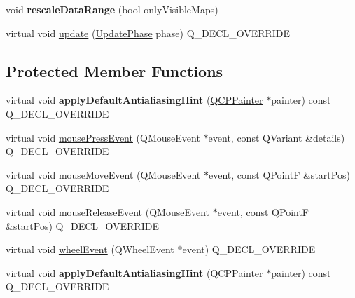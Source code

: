 \begin{DoxyCompactItemize}
\item 
void {\bfseries rescale\+Data\+Range} (bool only\+Visible\+Maps)\hypertarget{class_q_c_p_color_scale_a425983db4478543924ddbd04ea20a356}{}\label{class_q_c_p_color_scale_a425983db4478543924ddbd04ea20a356}

\item 
virtual void \hyperlink{class_q_c_p_color_scale_a5bbae1d186440907cc95b1afdcfd0290}{update} (\hyperlink{class_q_c_p_layout_element_a0d83360e05735735aaf6d7983c56374d}{Update\+Phase} phase) Q\+\_\+\+D\+E\+C\+L\+\_\+\+O\+V\+E\+R\+R\+I\+DE
\end{DoxyCompactItemize}
\subsection*{Protected Member Functions}
\begin{DoxyCompactItemize}
\item 
virtual void {\bfseries apply\+Default\+Antialiasing\+Hint} (\hyperlink{class_q_c_p_painter}{Q\+C\+P\+Painter} $\ast$painter) const Q\+\_\+\+D\+E\+C\+L\+\_\+\+O\+V\+E\+R\+R\+I\+DE\hypertarget{class_q_c_p_color_scale_af1b24d24a70f25b65d29f09e413390a8}{}\label{class_q_c_p_color_scale_af1b24d24a70f25b65d29f09e413390a8}

\item 
virtual void \hyperlink{class_q_c_p_color_scale_a91f633b97ffcd57fdf8cd814974c20e6}{mouse\+Press\+Event} (Q\+Mouse\+Event $\ast$event, const Q\+Variant \&details) Q\+\_\+\+D\+E\+C\+L\+\_\+\+O\+V\+E\+R\+R\+I\+DE
\item 
virtual void \hyperlink{class_q_c_p_color_scale_a3b2bd79725aefaf2630fc76e90939442}{mouse\+Move\+Event} (Q\+Mouse\+Event $\ast$event, const Q\+PointF \&start\+Pos) Q\+\_\+\+D\+E\+C\+L\+\_\+\+O\+V\+E\+R\+R\+I\+DE
\item 
virtual void \hyperlink{class_q_c_p_color_scale_a6a35dd39ab4e5cb2d7b29ebb4d5b61b0}{mouse\+Release\+Event} (Q\+Mouse\+Event $\ast$event, const Q\+PointF \&start\+Pos) Q\+\_\+\+D\+E\+C\+L\+\_\+\+O\+V\+E\+R\+R\+I\+DE
\item 
virtual void \hyperlink{class_q_c_p_color_scale_a63cf19be184f6670c9495ad3a9a1baeb}{wheel\+Event} (Q\+Wheel\+Event $\ast$event) Q\+\_\+\+D\+E\+C\+L\+\_\+\+O\+V\+E\+R\+R\+I\+DE
\item 
virtual void {\bfseries apply\+Default\+Antialiasing\+Hint} (\hyperlink{class_q_c_p_painter}{Q\+C\+P\+Painter} $\ast$painter) const Q\+\_\+\+D\+E\+C\+L\+\_\+\+O\+V\+E\+R\+R\+I\+DE\hypertarget{class_q_c_p_color_scale_ae931610a4f5bafe5912e5f1bf3057dd4}{}\label{class_q_c_p_color_scale_ae931610a4f5bafe5912e5f1bf3057dd4}


\end{DoxyCompactItemize}

